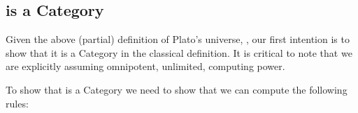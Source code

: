 \documentclass[a4paper,openany]{amsbook}
\begin{document}
\begin{prooftree}
\end{prooftree}

\subsection{\Universe{}{} is a Category}

Given the above (partial) definition of Plato's universe, \Universe{}{}, our first
intention is to show that it is a Category in the classical definition.  It is critical to
note that we are explicitly assuming omnipotent, unlimited, computing power.

To show that \Universe{}{} is a Category we need to show that we can compute the following 
rules:

\begin{prooftree}
\end{prooftree}

\begin{prooftree}
\end{prooftree}

\begin{prooftree}
\end{prooftree}

\begin{prooftree}
\end{prooftree}
\end{document}
